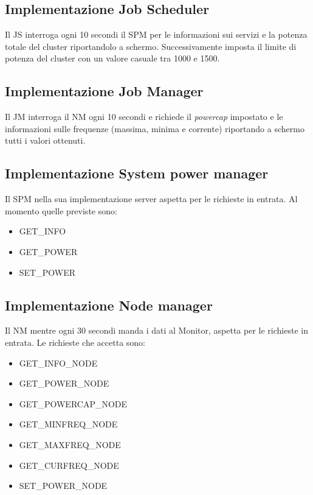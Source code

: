 \subsection*{Implementazione Job Scheduler}
Il JS interroga ogni 10 secondi il SPM per le informazioni sui servizi e la potenza totale del cluster riportandolo a schermo. Successivamente  imposta il limite di potenza del cluster con un valore casuale tra 1000 e 1500.

\subsection*{Implementazione Job Manager}
Il JM interroga il NM ogni 10 secondi e richiede il \emph{powercap} impostato e le informazioni sulle frequenze (massima, minima e corrente) riportando a schermo tutti i valori ottenuti.

\subsection*{Implementazione System power manager}
Il SPM nella sua implementazione server aspetta per le richieste in entrata. Al momento quelle previste sono:
\begin{itemize}
    \item GET\_INFO
    \item GET\_POWER
    \item SET\_POWER
\end{itemize}

\subsection*{Implementazione Node manager}
Il NM mentre ogni 30 secondi manda i dati al Monitor, aspetta per le richieste in entrata. Le richieste che accetta sono:
\begin{itemize}
    \item GET\_INFO\_NODE
    \item GET\_POWER\_NODE
    \item GET\_POWERCAP\_NODE 
    \item GET\_MINFREQ\_NODE   
    \item GET\_MAXFREQ\_NODE     
    \item GET\_CURFREQ\_NODE   
    \item SET\_POWER\_NODE
\end{itemize}

